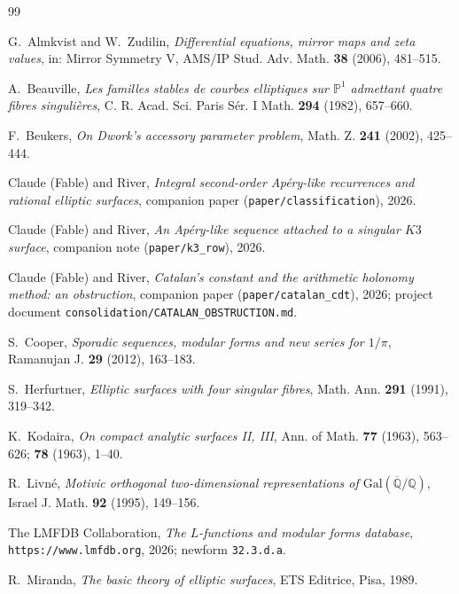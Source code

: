 \documentclass[11pt,reqno]{amsart}
\theoremstyle{plain}
\theoremstyle{definition}
\theoremstyle{remark}
\theoremstyle{plain}
\newcommand{\Q}{\mathbb{Q}}
\newcommand{\PP}{\mathbb{P}}
\begin{document}
\enlargethispage{3\baselineskip}
\begin{thebibliography}{99}
\scriptsize
\setlength{\itemsep}{0pt plus 0.5pt}

G.~Almkvist and W.~Zudilin,
\emph{Differential equations, mirror maps and zeta values},
in: Mirror Symmetry V, AMS/IP Stud. Adv. Math. \textbf{38} (2006), 481--515.

A.~Beauville,
\emph{Les familles stables de courbes elliptiques sur $\PP^1$ admettant quatre
fibres singuli\`eres},
C. R. Acad. Sci. Paris S\'er. I Math. \textbf{294} (1982), 657--660.

F.~Beukers,
\emph{On Dwork's accessory parameter problem},
Math. Z. \textbf{241} (2002), 425--444.

Claude (Fable) and River,
\emph{Integral second-order Ap\'ery-like recurrences and rational elliptic
surfaces}, companion paper (\texttt{paper/classification}), 2026.

Claude (Fable) and River,
\emph{An Ap\'ery-like sequence attached to a singular $K3$ surface},
companion note (\texttt{paper/k3\_row}), 2026.

Claude (Fable) and River,
\emph{Catalan's constant and the arithmetic holonomy method: an obstruction},
companion paper (\texttt{paper/catalan\_cdt}), 2026; project document
\texttt{consolidation/CATALAN\_OBSTRUCTION.md}.

S.~Cooper,
\emph{Sporadic sequences, modular forms and new series for $1/\pi$},
Ramanujan J. \textbf{29} (2012), 163--183.

S.~Herfurtner,
\emph{Elliptic surfaces with four singular fibres},
Math. Ann. \textbf{291} (1991), 319--342.

K.~Kodaira,
\emph{On compact analytic surfaces II, III},
Ann. of Math. \textbf{77} (1963), 563--626; \textbf{78} (1963), 1--40.

R.~Livn\'e,
\emph{Motivic orthogonal two-dimensional representations of
$\mathrm{Gal}(\overline{\Q}/\Q)$},
Israel J. Math. \textbf{92} (1995), 149--156.

The LMFDB Collaboration,
\emph{The $L$-functions and modular forms database},
\texttt{https://www.lmfdb.org}, 2026; newform \texttt{32.3.d.a}.

R.~Miranda,
\emph{The basic theory of elliptic surfaces},
ETS Editrice, Pisa, 1989.


\end{thebibliography}
\end{document}
